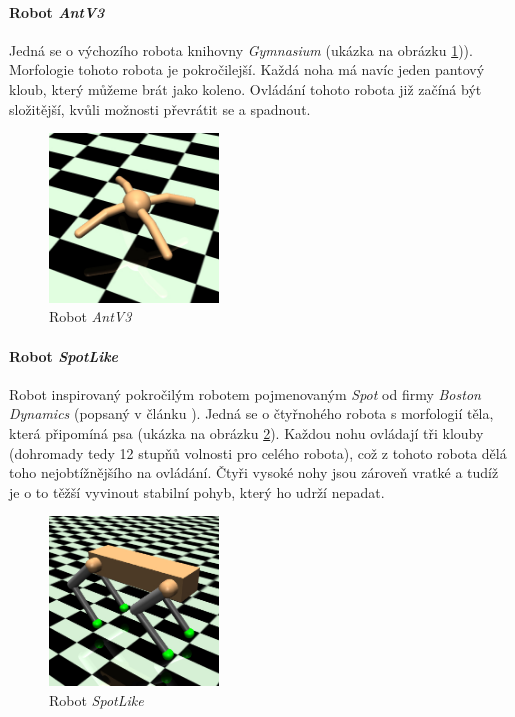 \paragraph{Robot \emph{AntV3}} \label{imp:robots.Ant}
Jedná se o výchozího robota knihovny \emph{Gymnasium} (ukázka na obrázku
\ref{imp:fig:robots.AntV3})). Morfologie tohoto robota je pokročilejší. Každá
noha má navíc jeden pantový kloub, který můžeme brát jako koleno. Ovládání
tohoto robota již začíná být složitější, kvůli možnosti převrátit se a
spadnout.
\begin{figure}[!htb]
    \centering
    \includegraphics[width=0.4\textwidth]{../img/crop_Ant-v3.jpg}
    \caption{Robot \emph{AntV3}}
    \label{imp:fig:robots.AntV3}
\end{figure}

\paragraph{Robot \emph{SpotLike}} \label{imp:robots.Spot}
Robot inspirovaný pokročilým robotem pojmenovaným \emph{Spot} od firmy
\emph{Boston Dynamics} (popsaný v článku \citep{guizzo2019leaps}). Jedná se o
čtyřnohého robota s morfologií těla, která připomíná psa (ukázka na obrázku
\ref{imp:fig:robots.SpotLike}). Každou nohu ovládají tři klouby (dohromady tedy
12 stupňů volnosti pro celého robota), což z tohoto robota dělá toho
nejobtížnějšího na ovládání. Čtyři vysoké nohy jsou zároveň vratké a tudíž je o
to těžší vyvinout stabilní pohyb, který ho udrží nepadat.

\begin{figure}[!htb]
    \centering
    \includegraphics[width=0.4\textwidth]{../img/crop_SpotLike.jpg}
    \caption{Robot \emph{SpotLike}}
    \label{imp:fig:robots.SpotLike}
\end{figure}


